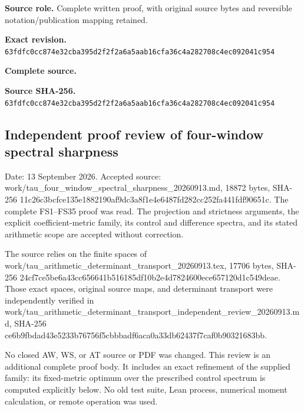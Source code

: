 \documentclass{article}
\begin{document}
\maketitle
\begingroup
\sloppy
\small

\noindent\textbf{Source role.} Complete written proof, with original source bytes and reversible notation/publication mapping retained.\par
\noindent\textbf{Exact revision.} \nolinkurl{63fdfc0cc874e32cba395d2f2f2a6a5aab16cfa36c4a282708c4ec092041c954}\par
\noindent\textbf{Complete source.} \par
\noindent\textbf{Source SHA-256.} \nolinkurl{63fdfc0cc874e32cba395d2f2f2a6a5aab16cfa36c4a282708c4ec092041c954}\par\medskip
\subsection{Independent proof review of four-window spectral sharpness}\label{endpoint-four_window_sharpness_review--independent-proof-review-of-four-window-spectral-sharpness}

Date: 13 September 2026. Accepted source: work/tau\_four\_window\_spectral\_sharpness\_20260913.md, 18872 bytes, SHA-256 11c26c3bcfce135e1882190af9dc3a8f1e4e6487fd282cc252fa441fdf90651c. The complete FS1--FS35 proof was read. The projection and strictness arguments, the explicit coefficient-metric family, its control and difference spectra, and its stated arithmetic scope are accepted without correction.

The source relies on the finite spaces of work/tau\_arithmetic\_determinant\_transport\_20260913.tex, 17706 bytes, SHA-256 24cf7ce5be6a43cc656641b516185df10b2e4d7824600ece657120d1c549deae. Those exact spaces, original source maps, and determinant transport were independently verified in work/tau\_arithmetic\_determinant\_transport\_independent\_review\_20260913.md, SHA-256 ce6b9fbdad43e5233b76756f5cbbbadf6aca0a33db62437f7caf0b90321683bb.

No closed AW, WS, or AT source or PDF was changed. This review is an additional complete proof body. It includes an exact refinement of the supplied family: its fixed-metric optimum over the prescribed control spectrum is computed explicitly below. No old test suite, Lean process, numerical moment calculation, or remote operation was used.
\end{document}
